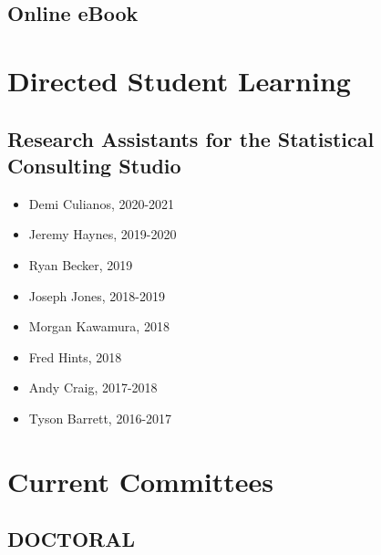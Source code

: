 \documentclass[11pt,a4paper,]{moderncv}
\providecommand{\tightlist}{%
	\setlength{\itemsep}{0pt}\setlength{\parskip}{0pt}}
\begin{document}
\hypertarget{refs_student}{}

\vspace{7mm}

\hypertarget{online-ebook}{%
\subsection{\texorpdfstring{\textbf{Online
eBook}}{Online eBook}}\label{online-ebook}}

\hypertarget{refs_ebook}{}

\clearpage

\hypertarget{directed-student-learning}{%
\section{Directed Student Learning}\label{directed-student-learning}}

\hypertarget{research-assistants-for-the-statistical-consulting-studio}{%
\subsection{\texorpdfstring{\textbf{Research Assistants for the
Statistical Consulting
Studio}}{Research Assistants for the Statistical Consulting Studio}}\label{research-assistants-for-the-statistical-consulting-studio}}

\begin{itemize}
\tightlist
\item
  Demi Culianos, 2020-2021
\item
  Jeremy Haynes, 2019-2020
\item
  Ryan Becker, 2019
\item
  Joseph Jones, 2018-2019
\item
  Morgan Kawamura, 2018
\item
  Fred Hints, 2018
\item
  Andy Craig, 2017-2018
\item
  Tyson Barrett, 2016-2017
\end{itemize}

\vspace{7 mm}

\hypertarget{current-committees}{%
\section{Current Committees}\label{current-committees}}

\hypertarget{doctoral}{%
\subsection{\texorpdfstring{\textbf{DOCTORAL}}{DOCTORAL}}\label{doctoral}}
\end{document}
